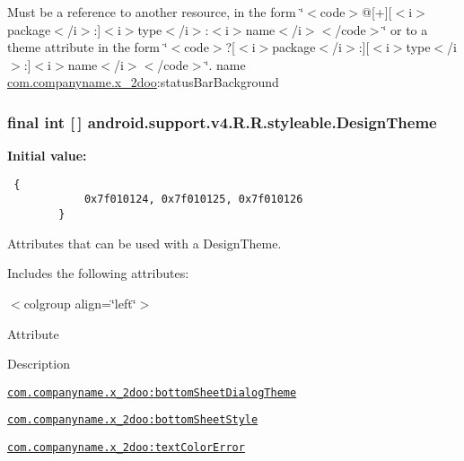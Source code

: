 Must be a reference to another resource, in the form \char`\"{}$<$code$>$@\mbox{[}+\mbox{]}\mbox{[}$<$i$>$package$<$/i$>$:\mbox{]}$<$i$>$type$<$/i$>$:$<$i$>$name$<$/i$>$$<$/code$>$\char`\"{} or to a theme attribute in the form \char`\"{}$<$code$>$?\mbox{[}$<$i$>$package$<$/i$>$:\mbox{]}\mbox{[}$<$i$>$type$<$/i$>$:\mbox{]}$<$i$>$name$<$/i$>$$<$/code$>$\char`\"{}.  name \hyperlink{namespacecom_1_1companyname_1_1x__2doo}{com.companyname.x\_\-2doo}:statusBarBackground \hypertarget{classandroid_1_1support_1_1v4_1_1_r_1_1styleable_1fc2363c6b6b67c6e45666c3b79caadd}{
\subsubsection[{DesignTheme}]{\setlength{\rightskip}{0pt plus 5cm}final int \mbox{[}$\,$\mbox{]} android.support.v4.R.R.styleable.DesignTheme}}
\label{classandroid_1_1support_1_1v4_1_1_r_1_1styleable_1fc2363c6b6b67c6e45666c3b79caadd}


\textbf{Initial value:}

\begin{Code}\begin{verbatim} {
            0x7f010124, 0x7f010125, 0x7f010126
        }
\end{verbatim}
\end{Code}
Attributes that can be used with a DesignTheme. 

Includes the following attributes: \begin{TabularC}{0}
\hline
\end{TabularC}
$<$colgroup align=\char`\"{}left\char`\"{}$>$ 

Attribute

Description 

{\tt \hyperlink{classandroid_1_1support_1_1v4_1_1_r_1_1styleable_c39dd68ad5c202e825274182cb02ccab}{com.companyname.x\_\-2doo:bottomSheetDialogTheme}}

{\tt \hyperlink{classandroid_1_1support_1_1v4_1_1_r_1_1styleable_b70c83958d9304b700d491f7de3a0af7}{com.companyname.x\_\-2doo:bottomSheetStyle}}

{\tt \hyperlink{classandroid_1_1support_1_1v4_1_1_r_1_1styleable_0574e76a7adf8330c0f630fbe9312cc2}{com.companyname.x\_\-2doo:textColorError}}

